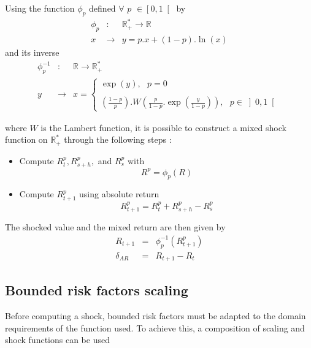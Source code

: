 \documentclass[3pt]{article}
\begin{document}
Using the function $\phi _{p}$ defined $\forall $ $p$ $\in \left[ 0,1\right[ 
$ by%
\begin{eqnarray*}
\phi _{p} &:&\mathbb{R}_{+}^{\ast }\rightarrow \mathbb{R} \\
x &\rightarrow &y=p.x+(1-p).\ln (x)
\end{eqnarray*}%
and its inverse 
\begin{eqnarray*}
\phi _{p}^{-1} &:&\mathbb{R}\rightarrow \mathbb{R}_{+}^{\ast } \\
y &\rightarrow &x=\left\{ 
\begin{array}{c}
\exp (y),\text{ \ \ \ \ \ \ \ \ \ \ \ \ \ \ \ \ \ \ \ \ \ \ \ \ \ }p=0 \\ 
\\ 
\left( \frac{1-p}{p}\right) .W\left( \frac{p}{1-p}.\exp \left( \frac{y}{1-p}%
\right) \right) ,\text{ }p\in \left] 0,1\right[ 
\end{array}%
\right. 
\end{eqnarray*}

where $W$ is the Lambert function, it is possible to construct a mixed shock
function on $\mathbb{R}_{+}^{\ast }$ through the following steps :

\bigskip

\begin{itemize}
\item Compute $R_{t}^{p},R_{s+h}^{p},$ and $R_{s}^{p}$ with 
\begin{equation*}
R^{p}=\phi _{p}(R)
\end{equation*}

\item Compute $R_{t+1}^{p}$ using absolute return 
\begin{equation*}
R_{t+1}^{p}=R_{t}^{p}+R_{s+h}^{p}-R_{s}^{p}
\end{equation*}
\end{itemize}

\bigskip 

The shocked value and the mixed return are then given by 
\begin{eqnarray*}
R_{t+1} &=&\phi _{p}^{-1}(R_{t+1}^{p}) \\
\delta _{AR} &=&R_{t+1}-R_{t}
\end{eqnarray*}

\subsection{Bounded risk factors scaling}

Before computing a shock, bounded risk factors must be adapted to the domain
requirements of the function used. To achieve this, a composition of scaling
and shock functions can be used
\end{document}
